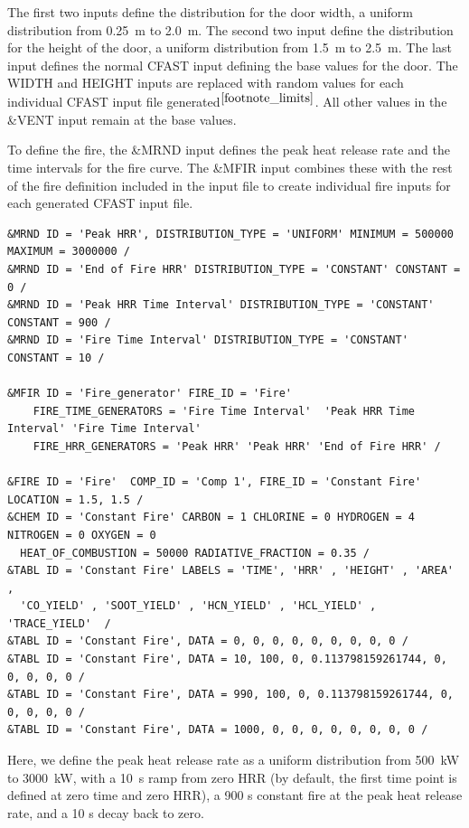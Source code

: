 \documentclass[12pt,twoside]{book}
\begin{document}
The first two inputs define the distribution for the door width, a uniform distribution from 0.25~m to 2.0~m. The second two input define the distribution for the height of the door, a uniform distribution from 1.5~m to 2.5~m. The last input defines the normal CFAST input defining the base values for the door. The {\ct WIDTH} and {\ct HEIGHT} inputs are replaced with random values for each individual CFAST input file generated$^{\ref{footnote_limits}}$. All other values in the {\ct \&VENT} input remain at the base values.

To define the fire, the {\ct \&MRND} input defines the peak heat release rate and the time intervals for the fire curve. The {\ct \&MFIR} input combines these with the rest of the fire definition included in the input file to create individual fire inputs for each generated CFAST input file.

\begin{lstlisting}[language=cdata, basicstyle=\scriptsize]
&MRND ID = 'Peak HRR', DISTRIBUTION_TYPE = 'UNIFORM' MINIMUM = 500000 MAXIMUM = 3000000 /
&MRND ID = 'End of Fire HRR' DISTRIBUTION_TYPE = 'CONSTANT' CONSTANT = 0 /
&MRND ID = 'Peak HRR Time Interval' DISTRIBUTION_TYPE = 'CONSTANT' CONSTANT = 900 /
&MRND ID = 'Fire Time Interval' DISTRIBUTION_TYPE = 'CONSTANT' CONSTANT = 10 /

&MFIR ID = 'Fire_generator' FIRE_ID = 'Fire'
	FIRE_TIME_GENERATORS = 'Fire Time Interval'  'Peak HRR Time Interval' 'Fire Time Interval'
	FIRE_HRR_GENERATORS = 'Peak HRR' 'Peak HRR' 'End of Fire HRR' /

&FIRE ID = 'Fire'  COMP_ID = 'Comp 1', FIRE_ID = 'Constant Fire'  LOCATION = 1.5, 1.5 /
&CHEM ID = 'Constant Fire' CARBON = 1 CHLORINE = 0 HYDROGEN = 4 NITROGEN = 0 OXYGEN = 0
  HEAT_OF_COMBUSTION = 50000 RADIATIVE_FRACTION = 0.35 /
&TABL ID = 'Constant Fire' LABELS = 'TIME', 'HRR' , 'HEIGHT' , 'AREA' ,
  'CO_YIELD' , 'SOOT_YIELD' , 'HCN_YIELD' , 'HCL_YIELD' , 'TRACE_YIELD'  /
&TABL ID = 'Constant Fire', DATA = 0, 0, 0, 0, 0, 0, 0, 0, 0 /
&TABL ID = 'Constant Fire', DATA = 10, 100, 0, 0.113798159261744, 0, 0, 0, 0, 0 /
&TABL ID = 'Constant Fire', DATA = 990, 100, 0, 0.113798159261744, 0, 0, 0, 0, 0 /
&TABL ID = 'Constant Fire', DATA = 1000, 0, 0, 0, 0, 0, 0, 0, 0 /
\end{lstlisting}

Here, we define the peak heat release rate as a uniform distribution from 500~kW to 3000~kW, with a 10~s ramp from zero HRR (by default, the first time point is defined at zero time and zero HRR), a 900 s constant fire at the peak heat release rate, and a 10 s decay back to zero.
\end{document}
